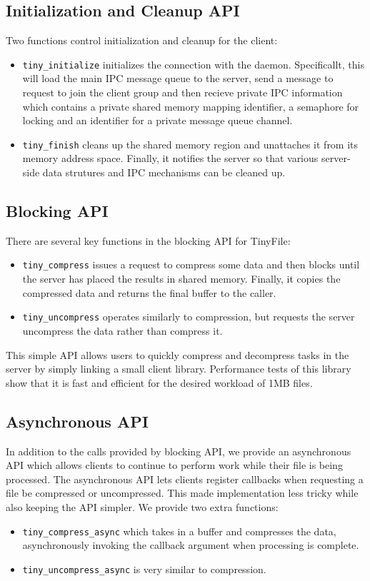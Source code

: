 \documentclass[paper=a4,fontsize=11pt]{report} %
\numberwithin{equation}{section} %
\numberwithin{figure}{section} %
\numberwithin{table}{section} %
\begin{document}
\subsection{Initialization and Cleanup API}
Two functions control initialization and cleanup for the client:
\begin{itemize}
	\item \texttt{tiny\_initialize} initializes the connection with the daemon. Specificallt, this will load the main IPC message queue to the server, send a message to request to join the client group and then recieve private IPC information which contains a private shared memory mapping identifier, a semaphore for locking and an identifier for a private message queue channel.
	\item \texttt{tiny\_finish} cleans up the shared memory region and unattaches it from its memory address space. Finally, it notifies the server so that various server-side data strutures and IPC mechanisms can be cleaned up.
\end{itemize}

\subsection{Blocking API}
There are several key functions in the blocking API for TinyFile:
\begin{itemize}
	\item \texttt{tiny\_compress} issues a request to compress some data and then blocks until the server has placed the results in shared memory. Finally, it copies the compressed data and returns the final buffer to the caller.
	\item \texttt{tiny\_uncompress} operates similarly to compression, but requests the server uncompress the data rather than compress it.
\end{itemize}

This simple API allows users to quickly compress and decompress tasks in the server by simply linking a small client library. Performance tests of this library show that it is fast and efficient for the desired workload of 1MB files.


\subsection{Asynchronous API}
In addition to the calls provided by blocking API, we provide an asynchronous API which allows clients to continue to perform work while their file is being processed. The asynchronous API lets clients register callbacks when requesting a file be compressed or uncompressed. This made implementation less tricky while also keeping the API simpler. We provide two extra functions:
\begin{itemize}
	\item \texttt{tiny\_compress\_async} which takes in a buffer and compresses the data, asynchronously invoking the callback argument when processing is complete.
	\item \texttt{tiny\_uncompress\_async} is very similar to compression.
\end{itemize}
\end{document}
